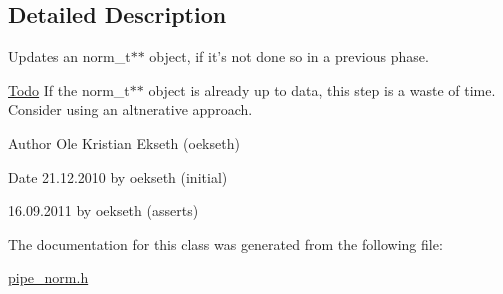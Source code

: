 \subsection{Detailed Description}
Updates an norm\_\-t$\ast$$\ast$ object, if it's not done so in a previous phase. 

\begin{Desc}
\item[\hyperlink{todo__todo000003}{Todo}]If the norm\_\-t$\ast$$\ast$ object is already up to data, this step is a waste of time. Consider using an altnerative approach. \end{Desc}
\begin{DoxyAuthor}{Author}
Ole Kristian Ekseth (oekseth) 
\end{DoxyAuthor}
\begin{DoxyDate}{Date}
21.12.2010 by oekseth (initial) 

16.09.2011 by oekseth (asserts) 
\end{DoxyDate}


The documentation for this class was generated from the following file:\begin{DoxyCompactItemize}
\item 
\hyperlink{pipe__norm_8h}{pipe\_\-norm.h}\end{DoxyCompactItemize}
